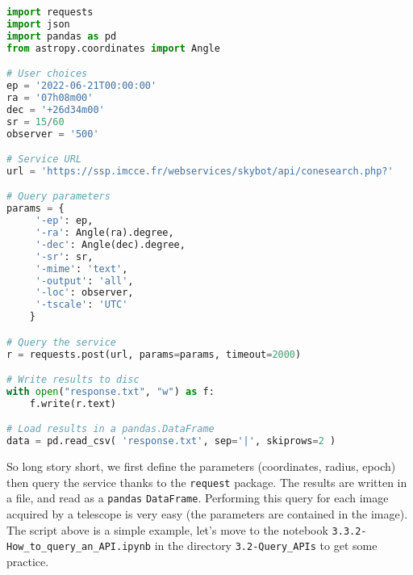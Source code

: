 \begin{lstlisting}[language=python]
import requests
import json
import pandas as pd
from astropy.coordinates import Angle

# User choices
ep = '2022-06-21T00:00:00'
ra = '07h08m00'
dec = '+26d34m00'
sr = 15/60
observer = '500'

# Service URL
url = 'https://ssp.imcce.fr/webservices/skybot/api/conesearch.php?'

# Query parameters
params = {
     '-ep': ep,
     '-ra': Angle(ra).degree,
     '-dec': Angle(dec).degree,
     '-sr': sr,
     '-mime': 'text',
     '-output': 'all',
     '-loc': observer, 
     '-tscale': 'UTC'
    }

# Query the service
r = requests.post(url, params=params, timeout=2000)

# Write results to disc
with open("response.txt", "w") as f:
    f.write(r.text)

# Load results in a pandas.DataFrame
data = pd.read_csv( 'response.txt', sep='|', skiprows=2 )
\end{lstlisting}

So long story short, we first define the parameters (coordinates, radius, epoch) then query the
\skybot service thanks to the \texttt{request} package. The results
are written in a file, and read as a \texttt{pandas} \texttt{DataFrame}.
Performing this query for each image acquired by a telescope is very easy
(the parameters are contained in the image).\\

The script above is a simple example, let's move to the notebook
\texttt{3.3.2-How\_to\_query\_an\_API.ipynb} in the directory 
\texttt{3.2-Query\_APIs} to get some practice.

